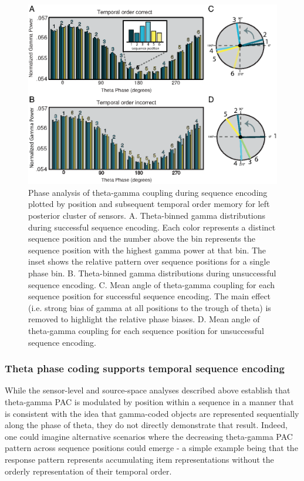 \begin{figure}
  \centering
  \includegraphics[width=\textwidth]{figures/chapter3_figure2.eps}
  \caption[Phase analysis of theta-gamma coupling by subsequent memory]{Phase analysis of theta-gamma coupling during sequence encoding plotted by position and subsequent temporal order memory for left posterior cluster of sensors.  A.  Theta-binned gamma distributions during successful sequence encoding.  Each color represents a distinct sequence position and the number above the bin represents the sequence position with the highest gamma power at that bin. The inset shows the relative pattern over sequence positions for a single phase bin.  B.  Theta-binned gamma distributions during unsuccessful sequence encoding.  C. Mean angle of theta-gamma coupling for each sequence position for successful sequence encoding.  The main effect (i.e. strong bias of gamma at all positions to the trough of theta) is removed to highlight the relative phase biases.  D. Mean angle of theta-gamma coupling for each sequence position for unsuccessful sequence encoding.}
  \label{chapter3_figure2}
\end{figure}

\subsubsection{Theta phase coding supports temporal sequence
encoding}\label{theta-phase-coding-supports-temporal-sequence-encoding}

While the sensor-level and source-space analyses described above
establish that theta-gamma PAC is modulated by position within a
sequence in a manner that is consistent with the idea that gamma-coded
objects are represented sequentially along the phase of theta, they do
not directly demonstrate that result. Indeed, one could imagine
alternative scenarios where the decreasing theta-gamma PAC pattern
across sequence positions could emerge - a simple example being that the
response pattern represents accumulating item representations without
the orderly representation of their temporal order.

